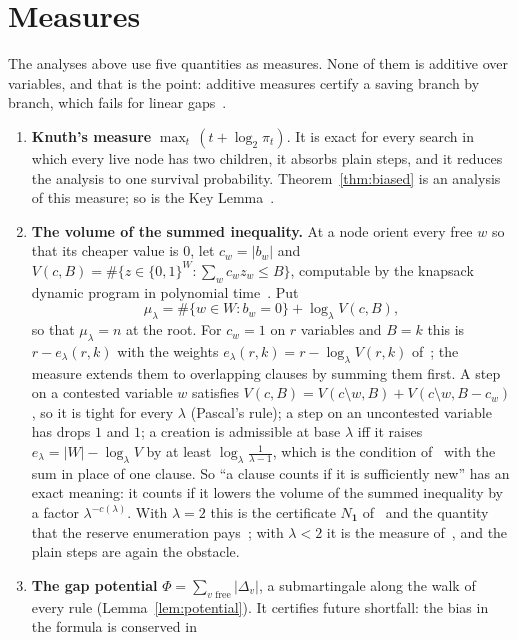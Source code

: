 \documentclass[11pt,a4paper]{article}
\theoremstyle{definition}
\theoremstyle{remark}
\begin{document}
\section{Measures}\label{sec:measures}

The analyses above use five quantities as measures. None of them is additive
over variables, and that is the point: additive measures certify a saving
branch by branch, which fails for linear gaps~\cite[Section~7.2]{N3}.

\begin{enumerate}
 \item \textbf{Knuth's measure} $\max_t\,(t+\log_2\pi_t)$. It is exact for
 every search in which every live node has two children, it absorbs plain
 steps, and it reduces the analysis to one survival probability.
 Theorem~\ref{thm:biased} is an analysis of this measure; so is the Key
 Lemma~\cite{N8}.
 \item \textbf{The volume of the summed inequality.} At a node orient every
 free $w$ so that its cheaper value is $0$, let $c_w=|b_w|$ and
 $V(c,B)=\#\{z\in\{0,1\}^W:\sum_wc_wz_w\le B\}$, computable by the knapsack
 dynamic program in polynomial time~\cite[Section~3]{N5}. Put
 \[
  \mu_\lambda=\#\{w\in W:b_w=0\}+\log_\lambda V(c,B),
 \]
 so that $\mu_\lambda=n$ at the root. For $c_w=1$ on $r$ variables and $B=k$
 this is $r-e_\lambda(r,k)$ with the weights $e_\lambda(r,k)=r-\log_\lambda V(r,k)$
 of~\cite[Theorem~10]{N4}; the measure extends them to overlapping clauses by
 summing them first. A step on a contested variable $w$ satisfies
 $V(c,B)=V(c\setminus w,B)+V(c\setminus w,B-c_w)$, so it is tight for every
 $\lambda$ (Pascal's rule); a step on an uncontested variable has drops $1$
 and $1$; a creation is admissible at base $\lambda$ iff it raises
 $e_\lambda=|W|-\log_\lambda V$ by at least $\log_\lambda\frac1{\lambda-1}$,
 which is the condition of~\cite[Lemma~7]{N4} with the sum in place of one
 clause. So ``a clause counts if it is sufficiently new'' has an exact
 meaning: it counts if it lowers the volume of the summed inequality by a
 factor $\lambda^{-c(\lambda)}$. With $\lambda=2$ this is the certificate
 $N_{\mathbf 1}$ of~\cite{N5} and the quantity that the reserve enumeration
 pays~\cite{EE}; with $\lambda<2$ it is the measure of~\cite{N4}, and the
 plain steps are again the obstacle.
 \item \textbf{The gap potential} $\Phi=\sum_{v\text{ free}}|\Delta_v|$, a
 submartingale along the walk of every rule (Lemma~\ref{lem:potential}). It
 certifies future shortfall: the bias in the formula is conserved in

\end{enumerate}
\end{document}
